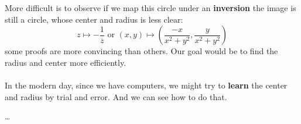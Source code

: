 \documentclass[12pt]{article}
\begin{document}
More difficult is to observe if we map this circle under an \textbf{inversion} the image is still a circle, whose center and radius is less clear:
$$ z \mapsto  - \frac{1}{\overline{z}} \text{ or } (x,y) \mapsto
 \left( \frac{-x}{x^2 + y^2 }, \frac{y}{x^2 + y^2 } \right)  $$
 some proofs are more convincing than others.  Our goal would be to find the radius and center more efficiently. \\ \\
 In the modern day, since we have computers, we might try to \textbf{learn} the center and radius by trial and error.  And we can see how to do that.

\newpage  


\begin{thebibliography}{}

\item \dots 

\end{thebibliography}
\end{document}
